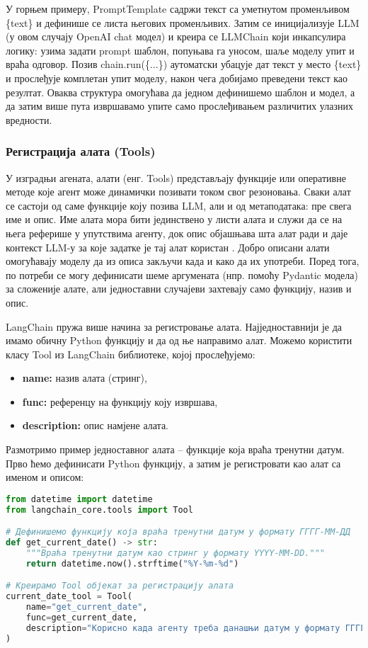 У горњем примеру, PromptTemplate садржи текст са уметнутом променљивом \{text\} и дефинише се листа његових променљивих. Затим се иницијализује LLM (у овом случају OpenAI chat модел) и креира се LLMChain који инкапсулира логику: узима задати prompt шаблон, попуњава га уносом, шаље моделу упит и враћа одговор. Позив chain.run(\{...\}) аутоматски убацује дат текст у место \{text\} и прослеђује комплетан упит моделу, након чега добијамо преведени текст као резултат. Оваква структура омогућава да једном дефинишемо шаблон и модел, а да затим више пута извршавамо упите само прослеђивањем различитих улазних вредности.

\subsubsection{Регистрација алата (Tools)}

У изградњи агената, алати (енг. Tools) представљају функције или оперативне методе које агент може динамички позивати током свог резоновања. Сваки алат се састоји од саме функције коју позива LLM, али и од метаподатака: пре свега име и опис. Име алата мора бити јединствено у листи алата и служи да се на њега реферише у упутствима агенту, док опис објашњава шта алат ради и даје контекст LLM-у за које задатке је тај алат користан \cite{langchain_docs_2024}. Добро описани алати омогућавају моделу да из описа закључи када и како да их употреби. Поред тога, по потреби се могу дефинисати шеме аргумената (нпр. помоћу Pydantic модела) за сложеније алате, али једноставни случајеви захтевају само функцију, назив и опис.

LangChain пружа више начина за регистровање алата. Најједноставнији је да имамо обичну Python функцију и да од ње направимо алат. Можемо користити класу Tool из LangChain библиотеке, којој прослеђујемо:
\begin{itemize}
    \item \textbf{name:} назив алата (стринг),
    \item \textbf{func:} референцу на функцију коју извршава,
    \item \textbf{description:} опис намјене алата.
\end{itemize}

Размотримо пример једноставног алата -- функције која враћа тренутни датум. Прво ћемо дефинисати Python функцију, а затим је регистровати као алат са именом и описом:

\begin{lstlisting}[language=Python, caption={Регистрација простог алата за тренутни датум}]
from datetime import datetime
from langchain_core.tools import Tool

# Дефинишемо функцију која враћа тренутни датум у формату ГГГГ-ММ-ДД
def get_current_date() -> str:
    """Враћа тренутни датум као стринг у формату YYYY-MM-DD."""
    return datetime.now().strftime("%Y-%m-%d")

# Креирамо Tool објекат за регистрaцију алата
current_date_tool = Tool(
    name="get_current_date",
    func=get_current_date,
    description="Корисно када агенту треба данашњи датум у формату ГГГГ-ММ-ДД"
)
\end{lstlisting}

